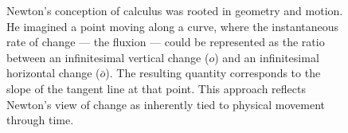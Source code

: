 \begin{figure}[H]
\centering
{}

\vspace{0.5em}
\caption{\small Newton's conception of calculus was rooted in geometry and motion. He imagined a point moving along a curve, where the instantaneous rate of change — the fluxion — could be represented as the ratio between an infinitesimal vertical change ($o$) and an infinitesimal horizontal change ($\bar{o}$). The resulting quantity corresponds to the slope of the tangent line at that point. This approach reflects Newton’s view of change as inherently tied to physical movement through time.}
\end{figure}

